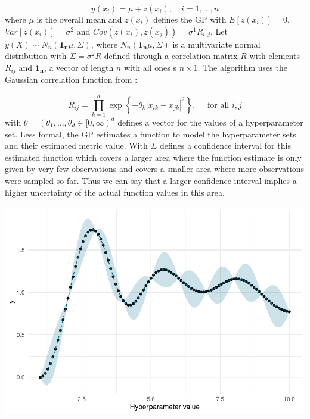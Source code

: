 \documentclass[12pt,a4paper]{article}
\let\origfigure\figure
\let\endorigfigure\endfigure
\renewenvironment{figure}[1][2] {
    \expandafter\origfigure\expandafter[H]
} {
    \endorigfigure
}
\begin{document}
\begin{equation}
y\left(x_{i}\right)=\mu+z\left(x_{i}\right) ; \quad i=1, \ldots, n
\label{eq:GP_model}
\end{equation}
where \(\mu\) is the overall mean and \(z(x_i)\) defines the GP with \(E[z(x_i)] = 0\), \(Var[z(x_i)]=\sigma^2\) and \(Cov(z(x_i),z(x_j))= \sigma^1R_{i,j}\). Let \(y(X) \sim N_{n}\left(\mathbf{1}_{\mathbf{n}} \mu, \Sigma\right)\), where \(N_{n}\left(\mathbf{1}_{\mathbf{n}} \mu, \Sigma\right)\) is a multivariate normal distribution with \(\Sigma=\sigma^{2} R\) defined through a correlation matrix \(R\) with elements \(R_{ij}\) and \(\mathbf{1}_{\mathbf{n}}\), a vector of length \(n\) with all ones s \(n\times 1\). The algorithm uses the Gaussian correlation function from \textcite{Ranjan2011}:

\begin{equation}
R_{i j}=\prod_{k=1}^{d} \exp \left\{-\theta_{k}\left|x_{i k}-x_{j k}\right|^{2}\right\}, \quad \text { for all } i, j
\end{equation} with \(\theta = (\theta_1,\ldots,\theta_d \in [0,\infty)^d\) defines a vector for the values of a hyperparameter set. Less formal, the GP estimates a function to model the hyperparameter sets and their estimated metric value. With \(\Sigma\) defines a confidence interval for this estimated function which covers a larger area where the function estimate is only given by very few observations and covers a smaller area where more observations were sampled so far. Thus we can say that a larger confidence interval implies a higher uncertainty of the actual function values in this area.

\begin{figure}[!H]
\includegraphics{Master_Thesis_files/figure-latex/baysianHPO-1} \caption{Examplary Gaussian Process for a single Hyperparameter}\label{fig:baysianHPO}
\end{figure}
\end{document}

